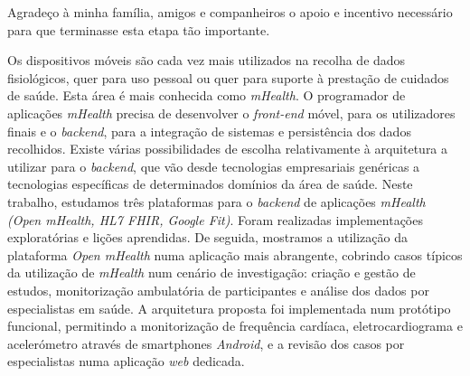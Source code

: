\documentclass[11pt,twoside,a4paper]{report}
\begin{document}
\TitlePage
  \vspace*{55mm}
       {Agradeço à minha família, amigos e companheiros o apoio e incentivo necessário para que terminasse esta etapa tão importante.}
\EndTitlePage
\titlepage\ \endtitlepage %

\TitlePage
  \vspace*{55mm}
  \vspace*{10mm}
       {Os dispositivos móveis são cada vez mais utilizados na recolha de dados fisiológicos, quer para uso pessoal ou quer para suporte à prestação de cuidados de saúde. Esta área é mais conhecida como \textit{mHealth}. O programador de aplicações \textit{mHealth} precisa de desenvolver o \textit{front-end} móvel, para os utilizadores finais e o \textit{backend}, para a integração de sistemas e persistência dos dados recolhidos. Existe várias possibilidades de escolha relativamente à arquitetura a utilizar para o \textit{backend}, que vão desde tecnologias empresariais genéricas a tecnologias específicas de determinados domínios da área de saúde. Neste trabalho, estudamos três plataformas para o \textit{backend} de aplicações \textit{mHealth (Open mHealth, HL7 FHIR, Google Fit)}. Foram realizadas implementações exploratórias e lições aprendidas.}
    \TEXT{}
       {De seguida, mostramos a utilização da plataforma \textit{Open mHealth} numa aplicação mais abrangente, cobrindo casos típicos da utilização de \textit{mHealth} num cenário de investigação: criação e gestão de estudos, monitorização ambulatória de participantes e análise dos dados por especialistas em saúde. A arquitetura proposta foi implementada num protótipo funcional, permitindo a monitorização de frequência cardíaca, eletrocardiograma e acelerómetro através de smartphones \textit{Android}, e a revisão dos casos por especialistas numa aplicação \textit{web} dedicada.   
       }
\EndTitlePage
\titlepage\ \endtitlepage %
\end{document}
